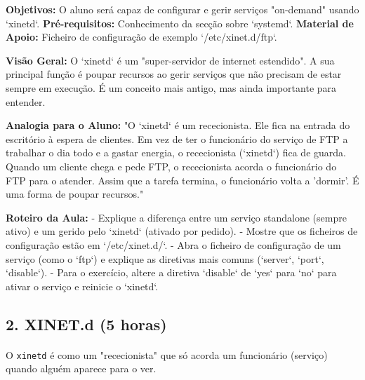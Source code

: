 \documentclass[10pt,a4paper]{article}
\newcommand{\guia}[1]{%
	\begin{tcolorbox}[
		colback=lightgray,
		colframe=darkblue,
		boxrule=1pt,
		arc=4mm,
		title=\textbf{Guia do Formador},
		fonttitle=\bfseries,
		coltitle=darkblue,
		boxsep=5pt,
		left=5mm, right=5mm, top=3mm, bottom=3mm
		]
		#1
	\end{tcolorbox}
}
\begin{document}
	\guia{
		\textbf{Objetivos:} O aluno será capaz de configurar e gerir serviços "on-demand" usando `xinetd`.
		\textbf{Pré-requisitos:} Conhecimento da secção sobre `systemd`.
		\textbf{Material de Apoio:} Ficheiro de configuração de exemplo `/etc/xinet.d/ftp`.
		
		\textbf{Visão Geral:} O `xinetd` é um "super-servidor de internet estendido". A sua principal função é poupar recursos ao gerir serviços que não precisam de estar sempre em execução. É um conceito mais antigo, mas ainda importante para entender.
		
		\textbf{Analogia para o Aluno:} "O `xinetd` é um rececionista. Ele fica na entrada do escritório à espera de clientes. Em vez de ter o funcionário do serviço de FTP a trabalhar o dia todo e a gastar energia, o rececionista (`xinetd`) fica de guarda. Quando um cliente chega e pede FTP, o rececionista acorda o funcionário do FTP para o atender. Assim que a tarefa termina, o funcionário volta a 'dormir'. É uma forma de poupar recursos."
		
		\textbf{Roteiro da Aula:}
		- Explique a diferença entre um serviço standalone (sempre ativo) e um gerido pelo `xinetd` (ativado por pedido).
		- Mostre que os ficheiros de configuração estão em `/etc/xinet.d/`.
		- Abra o ficheiro de configuração de um serviço (como o `ftp`) e explique as diretivas mais comuns (`server`, `port`, `disable`).
		- Para o exercício, altere a diretiva `disable` de `yes` para `no` para ativar o serviço e reinicie o `xinetd`.
	}
	\subsection*{2. XINET.d (5 horas)}
	\vspace{-1em}
	\paragraph{}
	O \texttt{xinetd} é como um "rececionista" que só acorda um funcionário (serviço) quando alguém aparece para o ver.
	
\end{document}
